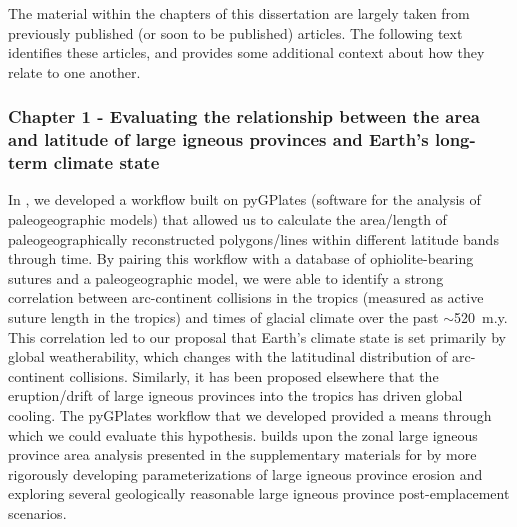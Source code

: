 \documentclass{ucbthesis}
\begin{document}
\begin{frontmatter}


\tableofcontents
\clearpage
\listoffigures
\clearpage
\listoftables


\begin{preface}

The material within the chapters of this dissertation are largely taken from previously published (or soon to be published) articles. The following text identifies these articles, and provides some additional context about how they relate to one another.

\subsubsection*{Chapter 1 - Evaluating the relationship between the area and latitude of large igneous provinces and Earth's long-term climate state}

\noindent
{}

\medskip

\noindent
{}

\bigskip

In \citet{Macdonald2019a}, we developed a workflow built on pyGPlates (software for the analysis of paleogeographic models) that allowed us to calculate the area/length of paleogeographically reconstructed polygons/lines within different latitude bands through time. By pairing this workflow with a database of ophiolite-bearing sutures and a paleogeographic model, we were able to identify a strong correlation between arc-continent collisions in the tropics (measured as active suture length in the tropics) and times of glacial climate over the past $\sim$520~m.y. This correlation led to our proposal that Earth's climate state is set primarily by global weatherability, which changes with the latitudinal distribution of arc-continent collisions. Similarly, it has been proposed elsewhere that the eruption/drift of large igneous provinces into the tropics has driven global cooling. The pyGPlates workflow that we developed provided a means through which we could evaluate this hypothesis. \citet{Park2019a} builds upon the zonal large igneous province area analysis presented in the supplementary materials for \citet{Macdonald2019a} by more rigorously developing parameterizations of large igneous province erosion and exploring several geologically reasonable large igneous province post-emplacement scenarios.


\end{preface}
\end{frontmatter}
\end{document}
